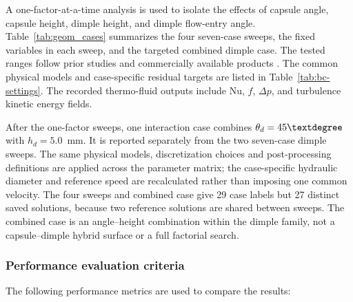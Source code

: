 \documentclass[energies,article,submit,moreauthors,noheaderline]{Definitions/mdpi}
\newcommand{\degree}{\texorpdfstring{\ensuremath{^\circ}}{\textdegree}}
\def\ensuremath#1{}%
\def\degree{\textdegree}%
\begin{document}
A one-factor-at-a-time analysis is used to isolate the effects of capsule angle, capsule height, dimple height, and dimple flow-entry angle. Table~\ref{tab:geom_cases} summarizes the four seven-case sweeps, the fixed variables in each sweep, and the targeted combined dimple case. The tested ranges follow prior studies and commercially available products \citep{hamedi2024, jiang2019, jiang2019a, jiang2020, soman2019, mocnik2024, jing2019, Alfalaval2022}. The common physical models and case-specific residual targets are listed in Table~\ref{tab:bc-settings}. The recorded thermo-fluid outputs include Nu, $f$, $\Delta p$, and turbulence kinetic energy fields.

After the one-factor sweeps, one interaction case combines $\theta_d=45\degree$ with $h_d=5.0$~mm. It is reported separately from the two seven-case dimple sweeps. The same physical models, discretization choices and post-processing definitions are applied across the parameter matrix; the case-specific hydraulic diameter and reference speed are recalculated rather than imposing one common velocity. The four sweeps and combined case give 29 case labels but 27 distinct saved solutions, because two reference solutions are shared between sweeps. The combined case is an angle--height combination within the dimple family, not a capsule--dimple hybrid surface or a full factorial search.

\subsubsection{Performance evaluation criteria}
\label{sec:performance_criteria}

The following performance metrics are used to compare the results:
\end{document}
